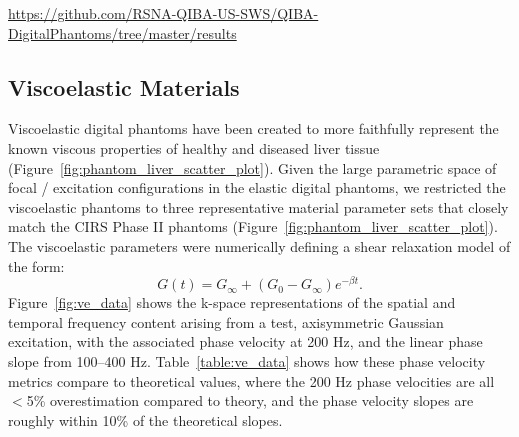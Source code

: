 \url{https://github.com/RSNA-QIBA-US-SWS/QIBA-DigitalPhantoms/tree/master/results}

\subsection{Viscoelastic Materials}
Viscoelastic digital phantoms have been created to more faithfully represent
the known viscous properties of healthy and diseased liver tissue
(Figure~\ref{fig:phantom_liver_scatter_plot}).  Given the large parametric
space of focal / excitation configurations in the elastic digital phantoms, we
restricted the viscoelastic phantoms to three representative material parameter
sets that closely match the CIRS Phase II phantoms
(Figure~\ref{fig:phantom_liver_scatter_plot}).  The viscoelastic parameters
were numerically defining a shear relaxation model of the form:
\begin{equation}
    G(t) = G_\infty + (G_0 - G_\infty)e^{-\beta t}.
\label{eqn:shear_relaxation}
\end{equation}
Figure~\ref{fig:ve_data} shows the k-space representations of the spatial and
temporal frequency content arising from a test, axisymmetric Gaussian
excitation, with the associated phase velocity at 200 Hz, and the linear phase
slope from 100--400 Hz.  Table~\ref{table:ve_data} shows how these phase
velocity metrics compare to theoretical values, where the 200 Hz phase
velocities are all $<$5\% overestimation compared to theory, and the phase
velocity slopes are roughly within 10\% of the theoretical slopes.

